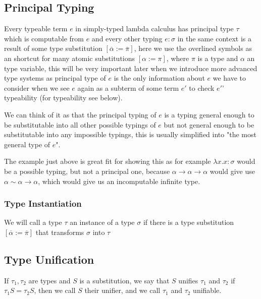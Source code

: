 \subsection{Principal Typing}

Every typeable term $e$ in simply-typed lambda calculus has principal type $\tau$ which is computable from $e$ and every other typing
$e : \sigma$ in the same context is a result of some type substitution $[\overline{\alpha} := \overline{\pi}]$, here we use the overlined symbols
as an shortcut for many atomic substitutions $[\alpha := \pi]$, where $\pi$ is a type and $\alpha$ an type variable, this will be very important
later when we introduce more advanced type systems as principal type of $e$ is the only information about $e$ we have to consider
when we see $e$ again as a subterm of some term $e'$ to check $e'$' typeability (for typeability see below). %

We can think of it as that the principal typing of $e$ is a typing general enough to be substitutable into all other possible typings of $e$
but not general enough to be substitutable into any impossible typings, this is usually simplified into "the most general type of $e$". %

The example just above %
is great fit for showing this as for example $\lambda x . x : \sigma$ would be a possible typing, but not a principal one, because
$\alpha \rightarrow \alpha \rightarrow \alpha$ would give use $\alpha \sim \alpha \rightarrow \alpha$, which would give us an incomputable
infinite type.

\subsubsection{Type Instantiation}

We will call a type $\tau$ an instance of a type $\sigma$ if there is a type substitution $[\overline{\alpha} := \overline{\pi}]$
that transforms $\sigma$ into $\tau$ %

\subsection{Type Unification}

If $\tau_1, \tau_2$ are types and $S$ is a substitution, we say that $S$ unifies
$\tau_1$ and $\tau_2$ if $\tau_1 S = \tau_2 S$, then we call $S$ their unifier, and we call $\tau_1$ and $\tau_2$ unifiable. %

